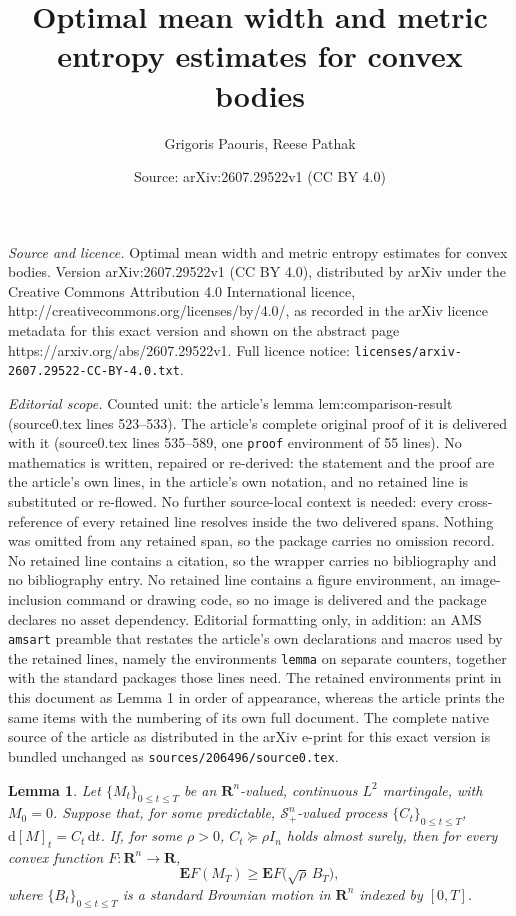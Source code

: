 \documentclass[10pt,a4paper]{amsart}
\title{Optimal mean width and metric entropy estimates for convex bodies}
\author{Grigoris Paouris, Reese Pathak}
\date{Source: arXiv:2607.29522v1 (CC BY 4.0)}
\newtheorem{lemma}{Lemma}
\newcommand{\E}{\mathbf E}
\newcommand{\R}{\mathbf R}
\newcommand{\cS}{\mathcal{S}}
\newcommand{\ud}{\mathrm{d}}
\begin{document}
\maketitle

\noindent\emph{Source and licence.} Optimal mean width and metric entropy estimates for convex bodies. Version arXiv:2607.29522v1 (CC BY 4.0), distributed by arXiv under the Creative Commons Attribution 4.0 International licence, http://creativecommons.org/licenses/by/4.0/, as recorded in the arXiv licence metadata for this exact version and shown on the abstract page https://arxiv.org/abs/2607.29522v1. Full licence notice: \texttt{licenses/arxiv-2607.29522-CC-BY-4.0.txt}.\par\smallskip

\noindent\textit{Editorial scope.} Counted unit: the article's lemma lem:comparison-result (source0.tex lines 523--533). The article's complete original proof of it is delivered with it (source0.tex lines 535--589, one \texttt{proof} environment of 55 lines). No mathematics is written, repaired or re-derived: the statement and the proof are the article's own lines, in the article's own notation, and no retained line is substituted or re-flowed.  No further source-local context is needed: every cross-reference of every retained line resolves inside the two delivered spans.  Nothing was omitted from any retained span, so the package carries no omission record.  No retained line contains a citation, so the wrapper carries no bibliography and no bibliography entry.  No retained line contains a figure environment, an image-inclusion command or drawing code, so no image is delivered and the package declares no asset dependency.  Editorial formatting only, in addition: an AMS \texttt{amsart} preamble that restates the article's own declarations and macros used by the retained lines, namely the environments \texttt{lemma} on separate counters, together with the standard packages those lines need.  The retained environments print in this document as Lemma 1 in order of appearance, whereas the article prints the same items with the numbering of its own full document.  The complete native source of the article as distributed in the arXiv e-print for this exact version is bundled unchanged as \texttt{sources/206496/source0.tex}.
\begin{lemma}
\label{lem:comparison-result}
Let $\{M_t\}_{0\leq t\leq T}$ be an $\R^n$-valued, continuous $L^2$ martingale, with $M_0=0$. 
Suppose that, for some predictable, $\cS^n_+$-valued process $\{C_t\}_{0 \leq t \leq T}$, $\ud [M]_t = C_t \, \ud t$. If, for some $\rho>0$,
$C_t \succeq \rho I_n$ holds almost surely, then 
for every convex function $F \colon \R^n\to\R$,
\[
\E F(M_T)\geq \E F\bigl(\sqrt{\rho}\,B_T\bigr),
\]
where $\{B_t\}_{0 \leq t\leq T}$ is a standard Brownian motion in $\R^n$ indexed by $[0, T]$.
\end{lemma}
\end{document}
